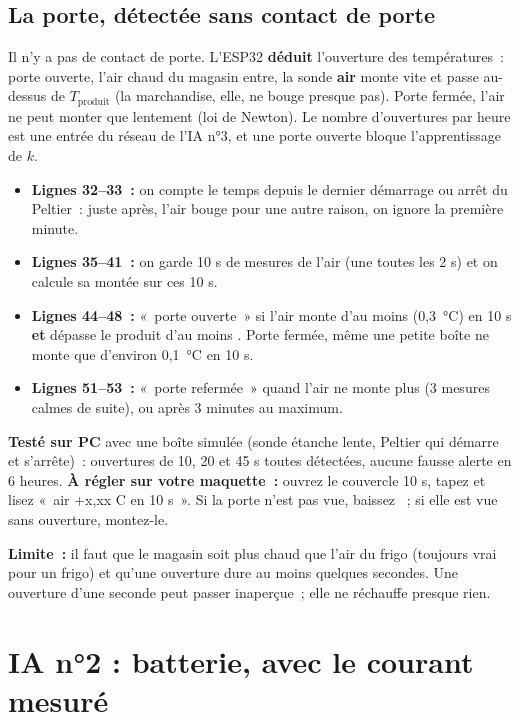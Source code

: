 \subsection{La porte, détectée sans contact de porte}\label{sec:porte}
Il n'y a pas de contact de porte. L'ESP32 \textbf{déduit} l'ouverture des températures~: porte ouverte, l'air chaud du magasin entre, la sonde \textbf{air} monte vite et passe au-dessus de $T_{\text{produit}}$ (la marchandise, elle, ne bouge presque pas). Porte fermée, l'air ne peut monter que lentement (loi de Newton). Le nombre d'ouvertures par heure est une entrée du réseau de l'IA n°3, et une porte ouverte bloque l'apprentissage de $k$.

\begin{itemize}
  \item \textbf{Lignes 32--33~:} on compte le temps depuis le dernier démarrage ou arrêt du Peltier~: juste après, l'air bouge pour une autre raison, on ignore la première minute.
  \item \textbf{Lignes 35--41~:} on garde 10 s de mesures de l'air (une toutes les 2 s) et on calcule sa montée sur ces 10 s.
  \item \textbf{Lignes 44--48~:} «~porte ouverte~» si l'air monte d'au moins  (0,3~°C) en 10 s \textbf{et} dépasse le produit d'au moins . Porte fermée, même une petite boîte ne monte que d'environ 0,1~°C en 10 s.
  \item \textbf{Lignes 51--53~:} «~porte refermée~» quand l'air ne monte plus (3 mesures calmes de suite), ou après 3 minutes au maximum.
\end{itemize}
\textbf{Testé sur PC} avec une boîte simulée (sonde étanche lente, Peltier qui démarre et s'arrête)~: ouvertures de 10, 20 et 45 s toutes détectées, aucune fausse alerte en 6 heures. \textbf{À régler sur votre maquette~:} ouvrez le couvercle 10 s, tapez  et lisez «~air +x,xx C en 10 s~». Si la porte n'est pas vue, baissez ~; si elle est vue sans ouverture, montez-le.

\textbf{Limite~:} il faut que le magasin soit plus chaud que l'air du frigo (toujours vrai pour un frigo) et qu'une ouverture dure au moins quelques secondes. Une ouverture d'une seconde peut passer inaperçue~; elle ne réchauffe presque rien.

\section{IA n°2 : batterie, avec le courant mesuré}\label{sec:ia2}

